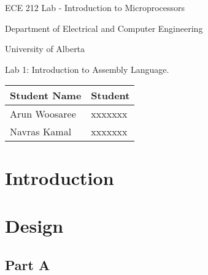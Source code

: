 \documentclass[letterpaper]{article}
\begin{document}
  \begin{titlepage}
    \begin{center}

      \LARGE
      ECE 212 Lab - Introduction to Microprocessors

      Department of Electrical and Computer Engineering

      University of Alberta

      \vspace{2cm}

      Lab 1: Introduction to Assembly Language.

      \vspace{5cm}
      \Large

      \begin{tabular}{ | m{5cm} | m{5cm} | }
        \hline
        Student Name & Student \\
        \hline
        Arun Woosaree & xxxxxxx \\
        \hline
        Navras Kamal & xxxxxxx \\
        \hline
      \end{tabular}




    \end{center}
\end{titlepage}


\tableofcontents
\newpage

\section{Introduction}
  \lipsum[1]
  \lipsum[2]

\section{Design}
  \subsection{Part A}
    \lipsum[3]
\end{document}
